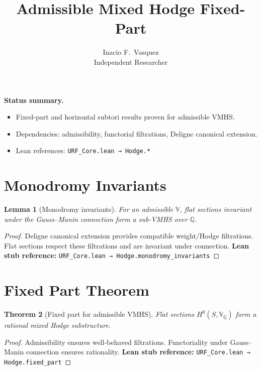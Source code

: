 \documentclass[11pt]{article}
\title{\textbf{Admissible Mixed Hodge Fixed-Part}}
\author{Inacio F.\ Vasquez \\ Independent Researcher}
\date{}
\theoremstyle{plain}
\newtheorem{theorem}{Theorem}
\newtheorem{lemma}[theorem]{Lemma}
\theoremstyle{remark}
\newcommand{\Q}{\mathbb{Q}}
\newcommand{\mathbbV}{\mathbb{V}}
\begin{document}
\maketitle

\begin{center}
\textbf{Status summary.}
\begin{itemize}
\item Fixed-part and horizontal subtori results proven for admissible VMHS.
\item Dependencies: admissibility, functorial filtrations, Deligne canonical extension.
\item Lean references: \texttt{URF\_Core.lean → Hodge.*}
\end{itemize}
\end{center}

\tableofcontents

\section{Monodromy Invariants}

\begin{lemma}[Monodromy invariants]\label{lem:hodge-monodromy}
For an admissible $\mathbbV$, flat sections invariant under the Gauss--Manin connection form a sub-VMHS over $\Q$.
\end{lemma}

\begin{proof}
Deligne canonical extension provides compatible weight/Hodge filtrations.  
Flat sections respect these filtrations and are invariant under connection.  
\textbf{Lean stub reference:} \texttt{URF\_Core.lean → Hodge.monodromy\_invariants}
\end{proof}

\section{Fixed Part Theorem}

\begin{theorem}[Fixed part for admissible VMHS]\label{thm:hodge-fixed-part}
Flat sections $H^0(S, \mathbbV_\Q)$ form a rational mixed Hodge substructure.
\end{theorem}

\begin{proof}
Admissibility ensures well-behaved filtrations.  
Functoriality under Gauss--Manin connection ensures rationality.  
\textbf{Lean stub reference:} \texttt{URF\_Core.lean → Hodge.fixed\_part}
\end{proof}
\end{document}
